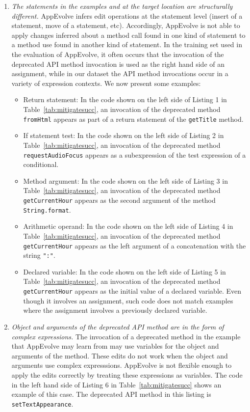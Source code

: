 \begin{enumerate}
\item {\em The statements in the examples and at the target location are
 structurally different.} AppEvolve infers edit operations at the statement
 level (insert of a statement, move of a statement, etc).  Accordingly,
 AppEvolve is not able to apply changes inferred about a method call found
 in one kind of statement to a method use found in another kind of
 statement.  In the training set used in the evaluation of AppEvolve, it
 often occurs that the invocation of the deprecated API method invocation
 is used as the right hand side of an assignment, while in our dataset the
 API method invocations occur in a variety of expression contexts.  We now
 present some examples:
\begin{itemize}
\item Return statement: 
In the code shown on the left side of Listing 1 in
Table~\ref{tab:mitigatesucc}, an invocation of the deprecated method {\tt
fromHtml} appears as part of a return statement of the {\tt getTitle}
method.

\item If statement test:
In the code shown on the left side of Listing 2 in
Table~\ref{tab:mitigatesucc}, an invocation of the deprecated method {\tt
requestAudioFocus} appears as a subexpression of the test expression of a
conditional.

\item Method argument:
In the code shown on the left side of Listing 3 in
Table~\ref{tab:mitigatesucc}, an invocation of the deprecated method {\tt
getCurrentHour} appears as the second argument of the method {\tt
String.format}.

\item Arithmetic operand:
In the code shown on the left side of Listing 4 in
Table~\ref{tab:mitigatesucc}, an invocation of the deprecated method {\tt
getCurrentHour} appears as the left argument of a concatenation with the
string {\tt ":"}.

\item Declared variable:
In the code shown on the left side of Listing 5 in
Table~\ref{tab:mitigatesucc}, an invocation of the deprecated method {\tt
getCurrentHour} appears as the initial value of a declared variable.  Even
though it involves an assignment, such code does not match examples where
the assignment involves a previously declared variable.
\end{itemize}

\item {\em Object and arguments of the deprecated API method are in the form of complex expressions.} The invocation of a deprecated method in the example that AppEvolve may learn from may use variables for the object and arguments of the method. These edits do not work when the object and arguments use complex expresssions. AppEvolve is not flexible enough to apply the edits correctly by treating these expressions as variables. The code in the left hand side of Listing 6 in Table~\ref{tab:mitigatesucc} shows an example of this case. The deprecated API method in this listing is {\tt setTextAppearance}.


\end{enumerate}

